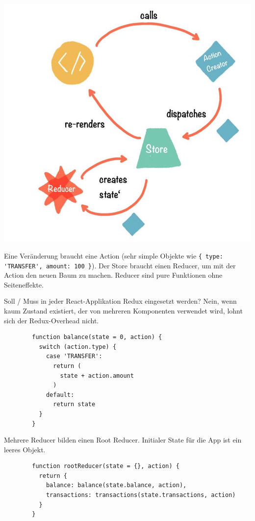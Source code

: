 \documentclass[10pt,landscape]{article}
\begin{document}
\begin{multicols}{2}
        \includegraphics[width=\linewidth]{redux_data_flow}

        Eine Veränderung braucht eine Action (sehr simple Objekte wie \lstinline!{ type: 'TRANSFER', amount: 100 }!).
        Der Store braucht einen Reducer, um mit der Action den neuen Baum zu machen.
        Reducer sind pure Funktionen ohne Seiteneffekte.

        Soll / Muss in jeder React-Applikation Redux eingesetzt werden?
        Nein, wenn kaum Zustand existiert, der von mehreren Komponenten verwendet wird, lohnt sich der Redux-Overhead nicht.

        \begin{lstlisting}
        function balance(state = 0, action) {
          switch (action.type) {
            case 'TRANSFER':
              return (
                state + action.amount
              )
            default:
              return state
          }
        }
        \end{lstlisting}

        Mehrere Reducer bilden einen Root Reducer.
        Initialer State für die App ist ein leeres Objekt.

        \begin{lstlisting}
        function rootReducer(state = {}, action) {
          return {
            balance: balance(state.balance, action),
            transactions: transactions(state.transactions, action)
          }
        }


\end{lstlisting}
\end{multicols}
\end{document}
